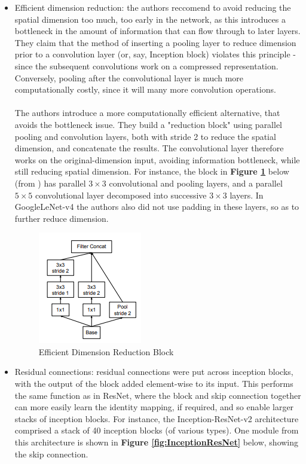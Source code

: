 \documentclass[11pt]{article} %
\theoremstyle{plain}
\theoremstyle{definition}
\begin{document}
\begin{itemize}
    \item Efficient dimension reduction: the authors reccomend to avoid reducing the spatial dimension too much, too early in the network, as this introduces a bottleneck in the amount of information that can flow through to later layers. They claim that the method of inserting a pooling layer to reduce dimension prior to a convolution layer (or, say, Inception block) violates this principle - since the subsequent convolutions work on a compressed representation. Conversely, pooling after the convolutional layer is much more computationally costly, since it will many more convolution operations. 
    \\
    \\
    \noindent
    The authors introduce a more computationally efficient alternative, that avoids the bottleneck issue. They build a "reduction block" using parallel pooling and convolution layers, both with stride 2 to reduce the spatial dimension, and concatenate the results. The convolutional layer therefore works on the original-dimension input, avoiding information bottleneck, while still reducing spatial dimension. For instance, the block in \textbf{Figure \ref{fig:EfficientSpatialReductionBlock}} below (from \cite{GoogLeNet_v3_Paper}) has parallel \(3 \times 3\) convolutional and pooling layers, and a parallel \(5 \times 5\) convolutional layer decomposed into successive \(3 \times 3\) layers. In GoogleLeNet-v4 the authors also did not use padding in these layers, so as to further reduce dimension.
    \begin{figure}[!ht]
        \centering    
        \caption{Efficient Dimension Reduction Block}
        \label{fig:EfficientSpatialReductionBlock}
        \includegraphics[scale=0.7]{EfficientSpatialReductionBlock.PNG}
    \end{figure}
    \item Residual connections: residual connections were put across inception blocks, with the output of the block added element-wise to its input. This performs the same function as in ResNet, where the block and skip connection together can more easily learn the identity mapping, if required, and so enable larger stacks of inception blocks. For instance, the Inception-ResNet-v2 architecture comprised a stack of 40 inception blocks (of various types). One module from this architecture is shown in \textbf{Figure \ref{fig:InceptionResNet}} below, showing the skip connection.

\end{itemize}
\end{document}
